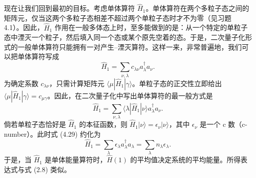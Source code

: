 现在让我们回到最初的目标。考虑单体算符 $\widehat{H}_1$。单体算符在两个多粒子态之间的矩阵元，仅当这两个多粒子态相差不超过两个单粒子态时才不为零（见习题 4.1）。因此，$\widehat{H}_1$ 作用在一般多体态上时，至多能做到的是：从一个特定的单粒子态中湮灭一个粒子，然后填入同一个态或某个原先空着的态。于是，二次量子化形式的一般单体算符只能拥有一对产生–湮灭算符。这样一来，非常普遍地，我们可以把单体算符写成
\begin{equation*}
\widehat{H}_1=\sum_{\nu,\lambda}c_{\lambda\nu}a_\lambda^\dagger a_\nu.
\tag{4.28}
\end{equation*}
为确定系数 $c_{\lambda\nu}$，只需计算矩阵元 $\langle\mu|\widehat{H}_1|\gamma\rangle$。单粒子态的正交性立即给出 $\langle\mu|\widehat{H}_1|\gamma\rangle=c_{\mu\gamma}$。因此，在二次量子化中写出单体算符的最一般方式是
\begin{equation*}
\widehat{H}_1=\sum_{\nu,\lambda}\langle\lambda|\widehat{H}_1|\nu\rangle a_\lambda^\dagger a_\nu.
\tag{4.29}
\end{equation*}
倘若单粒子态恰好是 $\widehat{H}_1$ 的本征函数，则 $\widehat{H}_1|\nu\rangle=\epsilon_\nu|\nu\rangle$，其中 $\epsilon_\nu$ 是一个 c 数（c-number）。此时式 (4.29) 约化为
\begin{equation*}
\widehat{H}_1=\sum_\lambda\epsilon_\lambda a_\lambda^\dagger a_\lambda=\sum_\lambda n_\lambda\epsilon_\lambda.
\tag{4.30}
\end{equation*}
于是，当 $\widehat{H}_1$ 是单体能量算符时，$\widehat{H}(1)$ 的平均值决定系统的平均能量。所得表达式与式 (2.8) 类似。

